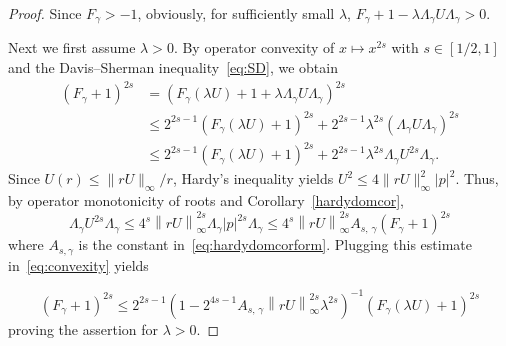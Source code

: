 \documentclass[10pt]{amsart}
\theoremstyle{definition}
\begin{document}
\begin{proof}
Since $F_\gamma>-1$, obviously, for sufficiently small $\lambda$, $F_{\gamma}+1 -\lambda \Lambda_\gamma U \Lambda_\gamma>0$.

Next we first assume $\lambda>0$. By operator convexity of $x\mapsto x^{2s}$ with $s\in[1/2,1]$ and the Davis--Sherman inequality~\eqref{eq:SD}, we obtain
\begin{equation}\label{eq:convexity}
\begin{split}
\left(F_\gamma+1\right)^{2s} &= \left(F_{\gamma}(\lambda U)+1 + \lambda \Lambda_\gamma U\Lambda_\gamma \right)^{2s}\\
&\leq 2^{2s-1}\left(F_{\gamma}(\lambda U)+1 \right)^{2s}
+ 2^{2s-1}\lambda^{2s}\left(\Lambda_\gamma U\Lambda_\gamma \right)^{2s}\\
&\leq 2^{2s-1}\left(F_{\gamma}(\lambda U)+1 \right)^{2s} + 2^{2s-1}\lambda^{2s}\Lambda_\gamma U^{2s}\Lambda_\gamma.
\end{split}
\end{equation}
Since $U(r)\leq \|rU\|_\infty/r$, Hardy's inequality yields $ U^2 \leq 4\|rU\|_\infty^2|p|^2$. Thus, by operator monotonicity of roots and Corollary~\ref{hardydomcor},
\[
\Lambda_\gamma U^{2s}\Lambda_\gamma \leq 4^s\left\|rU\right\|_\infty^{2s}\Lambda_\gamma |p|^{2s}\Lambda_\gamma
\leq 4^s\left\|rU\right\|_\infty^{2s}A_{s,\,\gamma}\left(F_\gamma+1\right)^{2s}
\]
where $A_{s,\gamma}$ is the constant in~\eqref{eq:hardydomcorform}. Plugging this estimate in~\eqref{eq:convexity} yields

\[
\left(F_\gamma+1\right)^{2s} \leq 2^{2s-1}\left(1-2^{4s-1}A_{s,\,\gamma}\left\|rU\right\|_\infty^{2s}\lambda^{2s}\right)^{-1}
\left(F_{\gamma}(\lambda U)+1\right)^{2s}
\]
proving the assertion for $\lambda>0$.


\end{proof}
\end{document}
